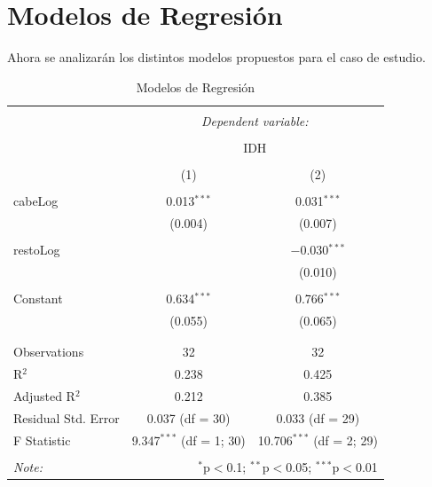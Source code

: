 \documentclass{article}
\begin{document}
\section{Modelos de Regresión}\label{modelos}

Ahora se analizarán los distintos modelos propuestos para el caso de estudio.


\begin{table}[!htbp] \centering 
  \caption{Modelos de Regresión} 
  \label{regresiones} 
\begin{tabular}{@{\extracolsep{5pt}}lcc} 
\\[-1.8ex]\hline 
\hline \\[-1.8ex] 
 & \multicolumn{2}{c}{\textit{Dependent variable:}} \\ 
\cline{2-3} 
\\[-1.8ex] & \multicolumn{2}{c}{IDH} \\ 
\\[-1.8ex] & (1) & (2)\\ 
\hline \\[-1.8ex] 
 cabeLog & 0.013$^{***}$ & 0.031$^{***}$ \\ 
  & (0.004) & (0.007) \\ 
  & & \\ 
 restoLog &  & $-$0.030$^{***}$ \\ 
  &  & (0.010) \\ 
  & & \\ 
 Constant & 0.634$^{***}$ & 0.766$^{***}$ \\ 
  & (0.055) & (0.065) \\ 
  & & \\ 
\hline \\[-1.8ex] 
Observations & 32 & 32 \\ 
R$^{2}$ & 0.238 & 0.425 \\ 
Adjusted R$^{2}$ & 0.212 & 0.385 \\ 
Residual Std. Error & 0.037 (df = 30) & 0.033 (df = 29) \\ 
F Statistic & 9.347$^{***}$ (df = 1; 30) & 10.706$^{***}$ (df = 2; 29) \\ 
\hline 
\hline \\[-1.8ex] 
\textit{Note:}  & \multicolumn{2}{r}{$^{*}$p$<$0.1; $^{**}$p$<$0.05; $^{***}$p$<$0.01} \\ 
\end{tabular} 
\end{table} 
\end{document}
